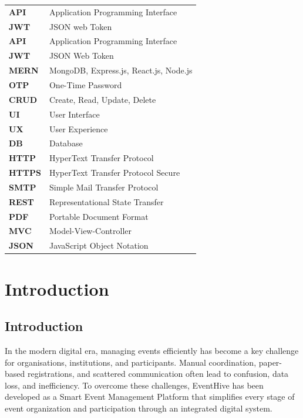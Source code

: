 \documentclass[12pt,a4paper]{report}
\begin{document}
\begin{tabular}{p{3cm}p{10cm}}
\textbf{API} & Application Programming Interface\\
\textbf{JWT} & JSON web Token\\
\textbf{API} & Application Programming Interface \\
\textbf{JWT} & JSON Web Token \\
\textbf{MERN} & MongoDB, Express.js, React.js, Node.js \\
\textbf{OTP} & One-Time Password \\
\textbf{CRUD} & Create, Read, Update, Delete \\
\textbf{UI} & User Interface \\
\textbf{UX} & User Experience \\
\textbf{DB} & Database \\
\textbf{HTTP} & HyperText Transfer Protocol \\
\textbf{HTTPS} & HyperText Transfer Protocol Secure \\
\textbf{SMTP} & Simple Mail Transfer Protocol \\
\textbf{REST} & Representational State Transfer \\
\textbf{PDF} & Portable Document Format \\
\textbf{MVC} & Model-View-Controller \\
\textbf{JSON} & JavaScript Object Notation \\
\end{tabular}

\clearpage

\pagestyle{main}

\chapter{Introduction}
\section{Introduction}
In the modern digital era, managing events efficiently has become a key challenge for organisations, institutions, and participants. Manual coordination, paper-based registrations, and scattered communication often lead to confusion, data loss, and inefficiency. To overcome these challenges, EventHive has been developed as a Smart Event Management Platform that simplifies every stage of event organization and participation through an integrated digital system.
\end{document}
